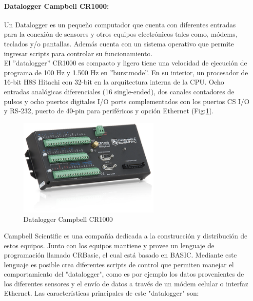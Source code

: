 \paragraph{Datalogger Campbell CR1000:}
Un Datalogger es un pequeño computador que cuenta con diferentes entradas para la conexión de sensores y otros equipos electrónicos tales como, módems, teclados y/o pantallas. Además cuenta con un sistema operativo que permite ingresar scripts para controlar su funcionamiento.\\El ''datalogger'' CR1000 es compacto y ligero tiene una velocidad de ejecución de programa de 100 Hz y 1.500 Hz en ''burstmode''. En su interior, un procesador de 16-bit H8S Hitachi con 32-bit en la arquitectura interna de la CPU.
Ocho entradas analógicas diferenciales (16 single-ended), dos canales contadores
de pulsos y ocho puertos digitales I/O ports complementados con los puertos CS I/O y RS-232, puerto de 40-pin para periféricos y opción Ethernet (Fig:\ref{cr1000}).

\begin{figure}[h!]
	\centering
	\includegraphics[width=200pt]{images/cr1000}
	\caption{Datalogger Campbell CR1000}
	\label{cr1000}
\end{figure}

Campbell Scientific es una compañía dedicada a la construcción y distribución de estos equipos. Junto con los equipos mantiene y provee un lenguaje de programación llamado CRBasic, el cual está basado en BASIC\cite{hardware:basic}. Mediante este lenguaje es posible crea diferentes scripts de control que permiten manejar el comportamiento del "datalogger", como es por ejemplo los datos provenientes de los diferentes sensores y el envío de datos a través de un módem celular o interfaz Ethernet. Las características principales de este "datalogger" son:

